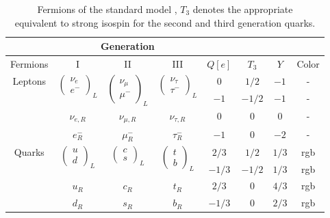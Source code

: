 \begin{table}[ht]
\caption{Fermions of the standard model \cite{Davids}, $T_3$ denotes the appropriate\\ equivalent to strong isospin for the second and third generation quarks.}
\begin{tabular}{|c||c|c|c|c|c|c|c|}
\cline{2-4}
\multicolumn{1}{c}{}& \multicolumn{3}{|c|}{Generation}& \multicolumn{4}{c}{}\\ \hline
Fermions & I & II & III & $Q[e]$ & $T_{3}$ & $Y$ & Color\\ \hline \hline
\multirow{4}{*}{Leptons} & \multirow{2}{*}{$\left(\begin{array}{c}\nu_{e}\\e^{-}\end{array}\right)_{L}$} & \multirow{2}{*}{$\left(\begin{array}{c}\nu_{\mu}\\ \mu^{-}\end{array}\right)_{L}$} & \multirow{2}{*}{$\left(\begin{array}{c}\nu_{\tau}\\ \tau^{-}\end{array}\right)_{L}$} & $0$ & $1/2$ & $-1$ & -\\\cline{5-8}
&  &  &  & $-1$ & $-1/2$ & $-1$ & -\\ \cline{5-8}
& $\nu_{e,R}$ & $\nu_{\mu,R}$ & $\nu_{\tau,R}$ & $0$ & $0$ & $0$ & -\\\cline{5-8}
& $e_{R}^{-}$ & $\mu_{R}^{-}$ & $\tau_{R}^{-}$ & $-1$ & $0$ & $-2$ & -\\ \hline
\multirow{4}{*}{Quarks} & \multirow{2}{*}{$\left(\begin{array}{c}u\\d\end{array}\right)_{L}$} & \multirow{2}{*}{$\left(\begin{array}{c}c\\s\end{array}\right)_{L}$} & \multirow{2}{*}{$\left(\begin{array}{c}t \\ b\end{array}\right)_{L}$} & $2/3$ & $1/2$ & $1/3$ & rgb\\\cline{5-8}
&  &  &  & $-1/3$ & $-1/2$ & $1/3$ & rgb\\ \cline{5-8}
& $u_{R}$ & $c_{R}$ & $t_{R}$ & $2/3$ & $0$ & $4/3$ & rgb\\\cline{5-8}
& $d_{R}$ & $s_{R}$ & $b_{R}$ & $-1/3$ & $0$ & $2/3$ & rgb\\ \hline
\end{tabular}
\centering
\label{tab_theo_sm_ferm}
\end{table}

